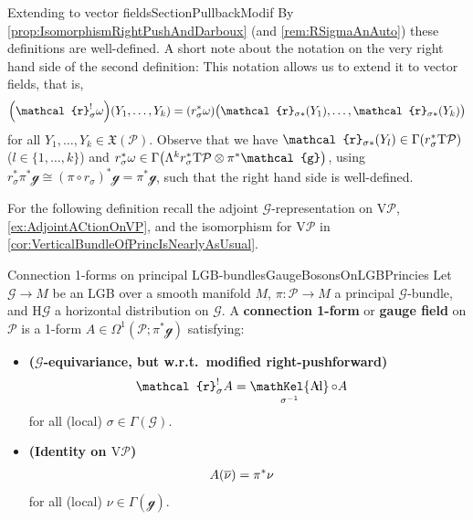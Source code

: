 \documentclass[reqno,a4paper,oneside]{amsart}
\theoremstyle{plain}
\theoremstyle{remark}
\theoremstyle{definition}
\DeclareMathOperator{\sAd}{\mathKel{A\mkern-5.5mu d}}
\begin{document}
\begin{remarks}{Extending to vector fields}{SectionPullbackModif}
By \ref{prop:IsomorphismRightPushAndDarboux} (and \ref{rem:RSigmaAnAuto}) these definitions are well-defined. A short note about the notation on the very right hand side of the second definition: This notation allows us to extend it to vector fields, that is,
\begin{align*}
\mleft(\mathcal{r}_\sigma^!\omega\mright) \mleft( Y_1, \dotsc, Y_k\mright)
=
\mleft(r_\sigma^*\omega\mright)\bigl( \mathcal{r}_{\sigma*}(Y_1), \dotsc, \mathcal{r}_{\sigma*}(Y_k)\bigr)
\end{align*}
for all $Y_1, \dotsc, Y_k \in \mathfrak{X}(\mathcal{P})$. Observe that we have $\mathcal{r}_{\sigma*}(Y_l) \in \Gamma\mleft(r_\sigma^*\mathrm{T}\mathcal{P}\mright)$ ($l \in \{1, \dotsc, k\}$) and $r_\sigma^*\omega \in \Gamma\mleft( \Lambda^k r_\sigma^*\mathrm{T}\mathcal{P} \otimes \pi^*\mathcal{g} \mright)$, using $r_\sigma^*\pi^*\mathcal{g} \cong (\pi \circ r_\sigma)^*\mathcal{g} = \pi^*\mathcal{g}$, such that the right hand side is well-defined.
\end{remarks}

For the following definition recall the adjoint $\mathcal{G}$-representation on $\mathrm{V}\mathcal{P}$, \ref{ex:AdjointACtionOnVP}, and the isomorphism for $\mathrm{V}\mathcal{P}$ in \ref{cor:VerticalBundleOfPrincIsNearlyAsUsual}.

\begin{definitions}{Connection 1-forms on principal LGB-bundles}{GaugeBosonsOnLGBPrincies}
Let $\mathcal{G} \to M$ be an LGB over a smooth manifold $M$, $\pi\colon\mathcal{P} \to M$ a principal $\mathcal{G}$-bundle, and $\mathrm{H}\mathcal{G}$ a horizontal distribution on $\mathcal{G}$. A \textbf{connection 1-form} or \textbf{gauge field} on $\mathcal{P}$ is a 1-form $A \in \Omega^1(\mathcal{P}; \pi^*\mathcal{g})$ satisfying:
\begin{itemize}
	\item \textbf{($\mathcal{G}$-equivariance, but w.r.t.\ modified right-pushforward)}
		\begin{align*} 
			\mathcal{r}_\sigma^! A
			&=
			\sAd_{\sigma^{-1}} \circ A
		\end{align*}
	for all (local) $\sigma \in \Gamma(\mathcal{G})$.
	\item \textbf{(Identity on $\mathrm{V}\mathcal{P}$)}
	\begin{align*}
	A\mleft(\overline{\nu}\mright)
	&=
	\pi^*\nu
	\end{align*}
	for all (local) $\nu \in \Gamma(\mathcal{g})$.
\end{itemize}
\end{definitions}
\end{document}
